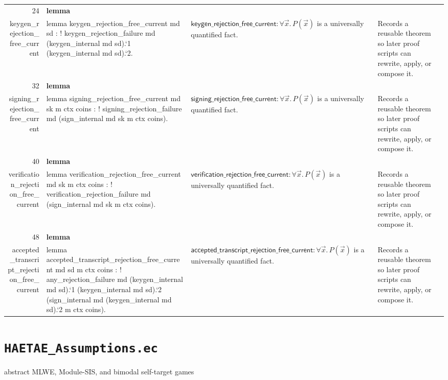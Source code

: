 \documentclass[10pt]{article}
\newcommand{\ec}[1]{\begingroup\ttfamily\scriptsize #1\endgroup}
\begin{document}
\begin{longtable}{r L{0.17\textwidth} L{0.26\textwidth} L{0.27\textwidth} L{0.20\textwidth}}
24 & \textbf{lemma}\\\ec{keygen\_rejection\_free\_current} & \ec{lemma keygen\_rejection\_free\_current md sd : ! keygen\_rejection\_failure md (keygen\_internal md sd).`1 (keygen\_internal md sd).`2.} & \(\mathsf{keygen\_rejection\_free\_current} : \forall \vec{x}.\, P(\vec{x})\) is a universally quantified fact. & Records a reusable theorem so later proof scripts can rewrite, apply, or compose it. \\
32 & \textbf{lemma}\\\ec{signing\_rejection\_free\_current} & \ec{lemma signing\_rejection\_free\_current md sk m ctx coins : ! signing\_rejection\_failure md (sign\_internal md sk m ctx coins).} & \(\mathsf{signing\_rejection\_free\_current} : \forall \vec{x}.\, P(\vec{x})\) is a universally quantified fact. & Records a reusable theorem so later proof scripts can rewrite, apply, or compose it. \\
40 & \textbf{lemma}\\\ec{verification\_rejection\_free\_current} & \ec{lemma verification\_rejection\_free\_current md sk m ctx coins : ! verification\_rejection\_failure md (sign\_internal md sk m ctx coins).} & \(\mathsf{verification\_rejection\_free\_current} : \forall \vec{x}.\, P(\vec{x})\) is a universally quantified fact. & Records a reusable theorem so later proof scripts can rewrite, apply, or compose it. \\
48 & \textbf{lemma}\\\ec{accepted\_transcript\_rejection\_free\_current} & \ec{lemma accepted\_transcript\_rejection\_free\_current md sd m ctx coins : ! any\_rejection\_failure md (keygen\_internal md sd).`1 (keygen\_internal md sd).`2 (sign\_internal md (keygen\_internal md sd).`2 m ctx coins).} & \(\mathsf{accepted\_transcript\_rejection\_free\_current} : \forall \vec{x}.\, P(\vec{x})\) is a universally quantified fact. & Records a reusable theorem so later proof scripts can rewrite, apply, or compose it. \\
\bottomrule
\end{longtable}

\clearpage
\section{\texorpdfstring{\texttt{HAETAE\_Assumptions.ec}}{HAETAE Assumptions.ec}}
abstract MLWE, Module-SIS, and bimodal self-target games
\end{document}
